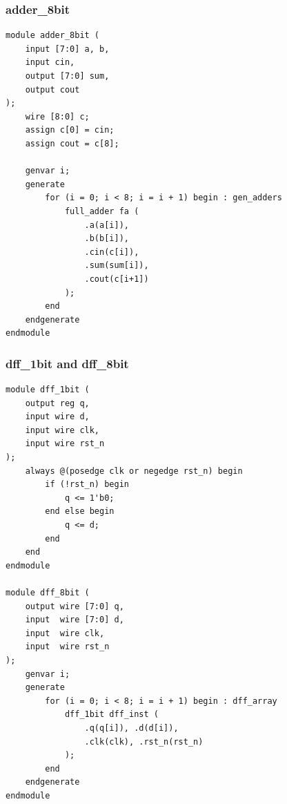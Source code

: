 \documentclass[12pt,a4paper]{article}
\begin{document}
\subsubsection*{adder\_8bit}
\begin{lstlisting}
module adder_8bit (
    input [7:0] a, b,
    input cin,
    output [7:0] sum,
    output cout
);
    wire [8:0] c;
    assign c[0] = cin;
    assign cout = c[8];

    genvar i;
    generate
        for (i = 0; i < 8; i = i + 1) begin : gen_adders
            full_adder fa (
                .a(a[i]), 
                .b(b[i]), 
                .cin(c[i]), 
                .sum(sum[i]), 
                .cout(c[i+1])
            );
        end
    endgenerate
endmodule
\end{lstlisting}

\subsubsection*{dff\_1bit and dff\_8bit}
\begin{lstlisting}
module dff_1bit (
    output reg q,
    input wire d,
    input wire clk,
    input wire rst_n
);
    always @(posedge clk or negedge rst_n) begin
        if (!rst_n) begin
            q <= 1'b0;
        end else begin
            q <= d;
        end
    end
endmodule

module dff_8bit (
    output wire [7:0] q,
    input  wire [7:0] d,
    input  wire clk,
    input  wire rst_n
);
    genvar i;
    generate
        for (i = 0; i < 8; i = i + 1) begin : dff_array
            dff_1bit dff_inst (
                .q(q[i]), .d(d[i]),
                .clk(clk), .rst_n(rst_n)
            );
        end
    endgenerate
endmodule
\end{lstlisting}
\end{document}
